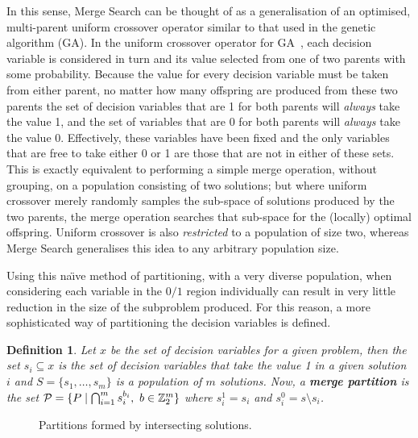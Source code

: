 \documentclass[authoryear,11pt,square,number,times,super,comma]{elsarticle}
\newtheorem{definition}{Definition}
\renewcommand{\S}[1]{\ensuremath{\mathcal{#1}}}
\newcommand{\Bin}{\ensuremath{\mathbb{Z}_2}}
\newcommand{\bemph}[1]{\textbf{\emph{#1}}}
\begin{document}
In this sense, Merge Search can be thought of as a generalisation of an optimised, multi-parent uniform crossover operator similar to that used in the genetic algorithm (GA). In the uniform crossover operator for GA~\citep{Luke2009}, each decision variable is considered in turn and its value selected from one of two parents with some probability. Because the value for every decision variable must be taken from either parent, no matter how many offspring are produced from these two parents the set of decision variables that are 1 for both parents will \emph{always} take the value 1, and the set of variables that are 0 for both parents will \emph{always} take the value 0. Effectively, these variables have been fixed and the only variables that are free to take either 0 or 1 are those that are not in either of these sets. This is exactly equivalent to performing a simple merge operation, without grouping, on a population consisting of two solutions; but where uniform crossover merely randomly samples the sub-space of solutions produced by the two parents, the merge operation searches that sub-space for the (locally) optimal offspring. Uniform crossover is also \emph{restricted} to a population of size two, whereas Merge Search generalises this idea to any arbitrary population size.

Using this na{\"\i}ve method of partitioning, with a very diverse population, when considering each variable in the $0/1$ region individually can result in very little reduction in the size of the subproblem produced. For this reason, a more sophisticated way of partitioning the decision variables is defined.

\begin{definition}\label{prop:part}
Let $x$ be the set of decision variables for a given problem, then the set $s_i \subseteq x$ is the set of decision variables that take the value 1 in a given solution $i$ and $S = \{s_1,\dots,s_m\}$ is a population of $m$ solutions. Now, a \bemph{merge partition} is the set ${\cal P} = \{P \mid \bigcap_{i=1}^{m} s^{b_i}_i,\ b \in \Bin^m\}$ %
where $s_i^1 = s_i$ and $s_i^0 = s \setminus s_i$.
\end{definition}

\begin{figure}[h!]
\centering
{}
\caption[Partitions formed by intersecting solutions]{Partitions formed by intersecting solutions.}
\label{fig:group_part}
\end{figure}
\end{document}
